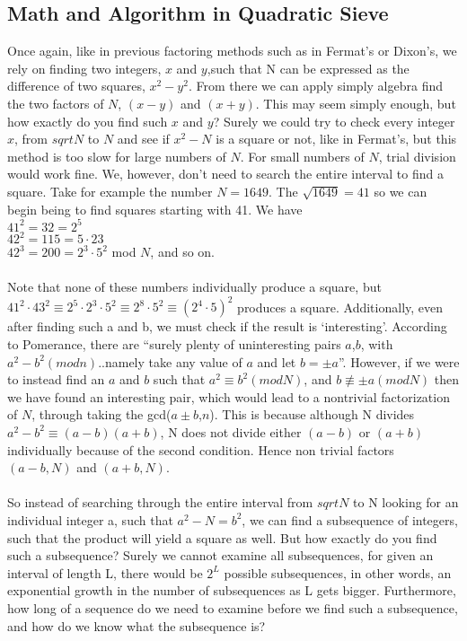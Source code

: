 \documentclass[12pt]{article} %
\begin{document}
\subsection {Math and Algorithm in Quadratic Sieve}
Once again, like in previous factoring methods such as in Fermat’s or Dixon’s, we rely on finding two integers, $x$ and $y$,such that N can be expressed as the difference of two squares, $x^{2}-y^{2}$. From there we can apply simply algebra find the two factors of $N$, $(x-y)$ and $(x+y)$. This may seem simply enough, but how exactly do you find such $x$ and $y$? Surely we could try to check every integer $x$, from $sqrt{N}$ to $N$ and see if $x^{2}-N$ is a square or not, like in Fermat’s, but this method is too slow for large numbers of $N$. For small numbers of $N$, trial division would work fine. We, however, don’t need to search the entire interval to find a square. Take for example the number $N = 1649$. The
 $\sqrt{1649} = 41$ so we can begin being to find squares starting with 41.  We have\\
 $41^{2} = 32 = 2^{5}$ \\ $42^{2} = 115 = 5\cdot 23$ \\ $42^{3} = 200 = 2^{3}\cdot 5^{2}$ mod $N$, and so on.
 \\\\Note that none of these numbers individually produce a square, but \\$41^{2}\cdot43^{2}\equiv 2^{5}\cdot2^{3}\cdot5^{2}\equiv 2^{8}\cdot5^{2}\equiv (2^{4}\cdot 5)^{2}$ produces a square. 
 Additionally, even after finding such a and b, we must check if the result is ‘interesting’. According to Pomerance, there are “surely plenty of uninteresting pairs $a$,$b$, with $a^{2}-b^{2}(mod  n)$..namely take any value of $a$ and let $b = \pm a$”. 
 However, if we were to instead find an $a$ and $b$ such that $a^{2}\equiv b^{2}(mod N)$, and $b \not\equiv \pm a(mod N)$ then we have found an interesting pair, which would lead to a nontrivial factorization of $N$, through taking the gcd($a\pm b$,$n$). This is because although N divides $a^{2}-b^{2}\equiv(a-b)(a+b)$, N does not divide either $(a-b)$ or $(a+b)$ individually because of the second condition. Hence non trivial factors $(a-b, N)$ and $(a+b, N)$. 
\\\\
So instead of searching through the entire interval from $sqrt{N}$ to N looking for an individual integer a, such that $a^{2} - N = b^{2}$, we can find a subsequence of integers, such that the product will yield a square as well. But how exactly do you find such a subsequence? Surely we cannot examine all subsequences, for given an interval of length L, there would be $2^{L}$ possible subsequences, in other words, an exponential growth in the number of subsequences as L gets bigger. Furthermore, how long of a sequence do we need to examine before we find such a subsequence, and how do we know what the subsequence is? 
\end{document}
